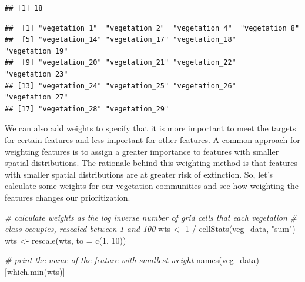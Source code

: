 \documentclass[
  12pt,
]{book}
\newenvironment{Shaded}{\begin{snugshade}}{\end{snugshade}}
\newcommand{\AttributeTok}[1]{\textcolor[rgb]{0.77,0.63,0.00}{#1}}
\newcommand{\CommentTok}[1]{\textcolor[rgb]{0.56,0.35,0.01}{\textit{#1}}}
\newcommand{\DecValTok}[1]{\textcolor[rgb]{0.00,0.00,0.81}{#1}}
\newcommand{\FloatTok}[1]{\textcolor[rgb]{0.00,0.00,0.81}{#1}}
\newcommand{\FunctionTok}[1]{\textcolor[rgb]{0.00,0.00,0.00}{#1}}
\newcommand{\NormalTok}[1]{#1}
\newcommand{\OtherTok}[1]{\textcolor[rgb]{0.56,0.35,0.01}{#1}}
\newcommand{\SpecialCharTok}[1]{\textcolor[rgb]{0.00,0.00,0.00}{#1}}
\newcommand{\StringTok}[1]{\textcolor[rgb]{0.31,0.60,0.02}{#1}}
\begin{document}
\begin{verbatim}
## [1] 18
\end{verbatim}

\begin{Shaded}
\end{Shaded}

\begin{verbatim}
##  [1] "vegetation_1"  "vegetation_2"  "vegetation_4"  "vegetation_8" 
##  [5] "vegetation_14" "vegetation_17" "vegetation_18" "vegetation_19"
##  [9] "vegetation_20" "vegetation_21" "vegetation_22" "vegetation_23"
## [13] "vegetation_24" "vegetation_25" "vegetation_26" "vegetation_27"
## [17] "vegetation_28" "vegetation_29"
\end{verbatim}

We can also add weights to specify that it is more important to meet the targets for certain features and less important for other features. A common approach for weighting features is to assign a greater importance to features with smaller spatial distributions. The rationale behind this weighting method is that features with smaller spatial distributions are at greater risk of extinction. So, let's calculate some weights for our vegetation communities and see how weighting the features changes our prioritization.

\begin{Shaded}
\begin{Highlighting}[]
\CommentTok{\# calculate weights as the log inverse number of grid cells that each vegetation}
\CommentTok{\# class occupies, rescaled between 1 and 100}
\NormalTok{wts }\OtherTok{\textless{}{-}} \DecValTok{1} \SpecialCharTok{/} \FunctionTok{cellStats}\NormalTok{(veg\_data, }\StringTok{"sum"}\NormalTok{)}
\NormalTok{wts }\OtherTok{\textless{}{-}} \FunctionTok{rescale}\NormalTok{(wts, }\AttributeTok{to =} \FunctionTok{c}\NormalTok{(}\DecValTok{1}\NormalTok{, }\DecValTok{10}\NormalTok{))}

\CommentTok{\# print the name of the feature with smallest weight}
\FunctionTok{names}\NormalTok{(veg\_data)[}\FunctionTok{which.min}\NormalTok{(wts)]}
\end{Highlighting}
\end{Shaded}
\end{document}
